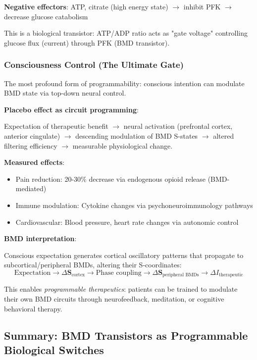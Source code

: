 \documentclass[11pt,a4paper]{article}
\begin{document}
\textbf{Negative effectors}: ATP, citrate (high energy state) $\to$ inhibit PFK $\to$ decrease glucose catabolism

This is a biological transistor: ATP/ADP ratio acts as "gate voltage" controlling glucose flux (current) through PFK (BMD transistor).

\subsubsection{Consciousness Control (The Ultimate Gate)}

The most profound form of programmability: conscious intention can modulate BMD state via top-down neural control\cite{benedetti2014placebo}.

\textbf{Placebo effect as circuit programming}:

Expectation of therapeutic benefit $\to$ neural activation (prefrontal cortex, anterior cingulate) $\to$ descending modulation of BMD S-states $\to$ altered filtering efficiency $\to$ measurable physiological change.

\textbf{Measured effects}\cite{benedetti2014placebo}:
\begin{itemize}
\item Pain reduction: 20-30\% decrease via endogenous opioid release (BMD-mediated)
\item Immune modulation: Cytokine changes via psychoneuroimmunology pathways
\item Cardiovascular: Blood pressure, heart rate changes via autonomic control
\end{itemize}

\textbf{BMD interpretation}:

Conscious expectation generates cortical oscillatory patterns that propagate to subcortical/peripheral BMDs, altering their S-coordinates:
\begin{equation}
\text{Expectation} \to \Delta \mathbf{S}_{\text{cortex}} \to \text{Phase coupling} \to \Delta \mathbf{S}_{\text{peripheral BMDs}} \to \Delta I_{\text{therapeutic}}
\end{equation}

This enables \textit{programmable therapeutics}: patients can be trained to modulate their own BMD circuits through neurofeedback, meditation, or cognitive behavioral therapy.

\subsection{Summary: BMD Transistors as Programmable Biological Switches}
\end{document}
